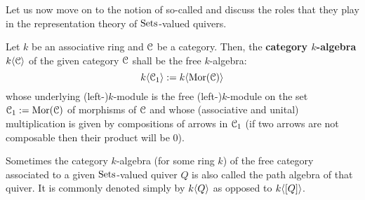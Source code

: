             Let us now move on to the notion of so-called  and discuss the roles that they play in the representation theory of $\mathrm{Sets}$-valued quivers. 
            \begin{definition} \label{def: category_algebras}
                Let $k$ be an associative ring and $\mathcal{C}$ be a category. Then, the \textbf{category $k$-algebra} $k\langle\mathcal{C}\rangle$ of the given category $\mathcal{C}$ shall be the free $k$-algebra:
                    $$k\langle\mathcal{C}_1\rangle := k\langle\mathrm{Mor}(\mathcal{C})\rangle$$
                whose underlying (left-)$k$-module is the free (left-)$k$-module on the set $\mathcal{C}_1 := \mathrm{Mor}(\mathcal{C})$ of morphisms of $\mathcal{C}$ and whose (associative and unital) multiplication is given by compositions of arrows in $\mathcal{C}_1$ (if two arrows are not composable then their product will be $0$).
            \end{definition}
            \begin{convention}
                Sometimes the category $k$-algebra (for some ring $k$) of the free category associated to a given $\mathrm{Sets}$-valued quiver $Q$ is also called the path algebra of that quiver. It is commonly denoted simply by $k\langle Q\rangle$ as opposed to $k\langle[Q]\rangle$.
            \end{convention}
